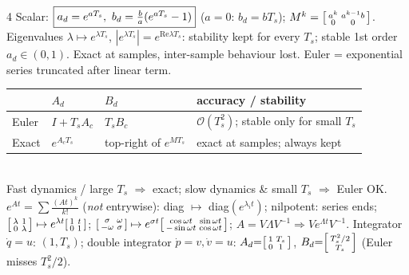 \documentclass[a4paper,landscape]{article}
\newcommand{\T}{^{\!\top}}
\newcommand{\bx}[1]{\fbox{$\textstyle #1$}}
\begin{document}
\begin{multicols*}{4}
Scalar: $\bx{a_d=e^{aT_s},\ b_d=\frac ba(e^{aT_s}-1)}$ ($a{=}0$: $b_d=bT_s$); $M^k=\begin{bsmallmatrix}a^k&a^{k-1}b\\0&0\end{bsmallmatrix}$. Eigenvalues $\lambda\mapsto e^{\lambda T_s}$, $|e^{\lambda T_s}|=e^{\mathrm{Re}\lambda T_s}$: stability kept for every $T_s$; stable 1st order $a_d\in(0,1)$. Exact at samples, inter-sample behaviour lost. Euler = exponential series truncated after linear term.\\
\begin{tabular}{@{}llll@{}}\toprule
&$A_d$&$B_d$&accuracy / stability\\\midrule
Euler & $I{+}T_sA_c$ & $T_sB_c$ & $\mathcal O(T_s^2)$; stable only for small $T_s$\\
Exact & $e^{A_cT_s}$ & top-right of $e^{MT_s}$ & exact at samples; always kept\\\bottomrule
\end{tabular}\\
Fast dynamics / large $T_s$ $\Rightarrow$ exact; slow dynamics \& small $T_s$ $\Rightarrow$ Euler OK.\\
$e^{At}=\sum\frac{(At)^k}{k!}$ (\emph{not} entrywise): diag $\mapsto$ diag$(e^{\lambda_it})$; nilpotent: series ends; $\begin{bsmallmatrix}\lambda&1\\0&\lambda\end{bsmallmatrix}\mapsto e^{\lambda t}\begin{bsmallmatrix}1&t\\0&1\end{bsmallmatrix}$; $\begin{bsmallmatrix}\sigma&\omega\\-\omega&\sigma\end{bsmallmatrix}\mapsto e^{\sigma t}\begin{bsmallmatrix}\cos\omega t&\sin\omega t\\-\sin\omega t&\cos\omega t\end{bsmallmatrix}$; $A{=}V\Lambda V^{-1}\Rightarrow Ve^{\Lambda t}V^{-1}$.
Integrator $\dot q{=}u$: $(1,T_s)$; double integrator $\dot p{=}v,\dot v{=}u$: $A_d{=}\begin{bsmallmatrix}1&T_s\\0&1\end{bsmallmatrix}$, $B_d{=}\begin{bsmallmatrix}T_s^2/2\\T_s\end{bsmallmatrix}$ (Euler misses $T_s^2/2$).


\end{multicols*}
\end{document}
